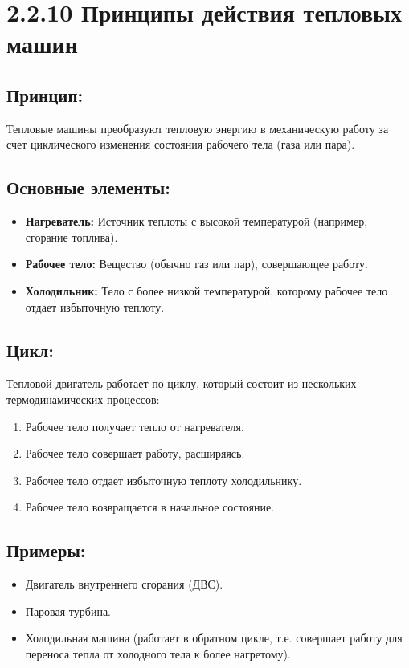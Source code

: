 \documentclass[a4paper,12pt]{article}
\begin{document}
\section*{2.2.10 Принципы действия тепловых машин}

\vspace{-9pt}
\subsection*{Принцип:}
\vspace{-3pt}
Тепловые машины преобразуют тепловую энергию в механическую работу за счет циклического изменения состояния рабочего тела (газа или пара).

\vspace{-9pt}
\subsection*{Основные элементы:}
\vspace{-3pt}
\begin{itemize}
    \item \textbf{Нагреватель:} Источник теплоты с высокой температурой (например, сгорание топлива).
    \item \textbf{Рабочее тело:} Вещество (обычно газ или пар), совершающее работу.
    \item \textbf{Холодильник:} Тело с более низкой температурой, которому рабочее тело отдает избыточную теплоту.
\end{itemize}
\newpage
\vspace{-9pt}
\subsection*{Цикл:}
\vspace{-3pt}
Тепловой двигатель работает по циклу, который состоит из нескольких термодинамических процессов:
\begin{enumerate}[itemsep=0pt, topsep=0pt, parsep=3pt]
    \item Рабочее тело получает тепло от нагревателя.
    \item Рабочее тело совершает работу, расширяясь.
    \item Рабочее тело отдает избыточную теплоту холодильнику.
    \item Рабочее тело возвращается в начальное состояние.
\end{enumerate}

\vspace{-9pt}
\subsection*{Примеры:}
\vspace{-3pt}
\begin{itemize}
    \item Двигатель внутреннего сгорания (ДВС).
    \item Паровая турбина.
    \item Холодильная машина (работает в обратном цикле, т.е. совершает работу для переноса тепла от холодного тела к более нагретому).
\end{itemize}
\end{document}
